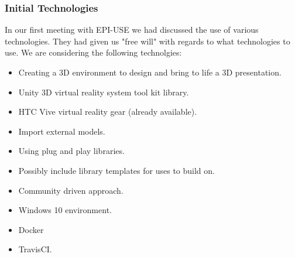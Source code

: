 \documentclass{article}
\begin{document}
	\subsubsection{Initial Technologies}
		In our first meeting with EPI-USE we had discussed the use of various technologies. They had given us "free will" with regards to what technologies to use. We are considering the following technolgies:
		\begin{itemize}
			\item Creating a 3D environment to design and bring to life a 3D presentation.
			\item Unity 3D virtual reality system tool kit library.
			\item HTC Vive virtual reality gear (already available).
			\item Import external models.
			\item Using plug and play libraries.
			\item Possibly include library templates for uses to build on.
			\item Community driven approach.
			\item Windows 10 environment.
			\item Docker
			\item TravisCI.
		\end{itemize}
\end{document}

